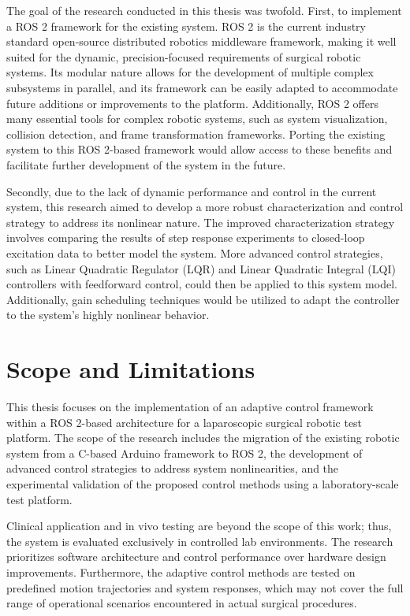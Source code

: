 The goal of the research conducted in this thesis was twofold. First, to implement a ROS 2 framework for the existing system. ROS 2 is the current industry standard open-source distributed robotics middleware framework, making it well suited for the dynamic, precision-focused requirements of surgical robotic systems. Its modular nature allows for the development of multiple complex subsystems in parallel, and its framework can be easily adapted to accommodate future additions or improvements to the platform. Additionally, ROS 2 offers many essential tools for complex robotic systems, such as system visualization, collision detection, and frame transformation frameworks. Porting the existing system to this ROS 2-based framework would allow access to these benefits and facilitate further development of the system in the future.

Secondly, due to the lack of dynamic performance and control in the current system, this research aimed to develop a more robust characterization and control strategy to address its nonlinear nature. The improved characterization strategy involves comparing the results of step response experiments to closed-loop excitation data to better model the system. More advanced control strategies, such as Linear Quadratic Regulator (LQR) and Linear Quadratic Integral (LQI) controllers with feedforward control, could then be applied to this system model. Additionally, gain scheduling techniques would be utilized to adapt the controller to the system’s highly nonlinear behavior.


\section{Scope and Limitations}
\label{section:scope_limitations}

This thesis focuses on the implementation of an adaptive control framework within a ROS 2-based architecture for a laparoscopic surgical robotic test platform. The scope of the research includes the migration of the existing robotic system from a C-based Arduino framework to ROS 2, the development of advanced control strategies to address system nonlinearities, and the experimental validation of the proposed control methods using a laboratory-scale test platform.

Clinical application and in vivo testing are beyond the scope of this work; thus, the system is evaluated exclusively in controlled lab environments. The research prioritizes software architecture and control performance over hardware design improvements. Furthermore, the adaptive control methods are tested on predefined motion trajectories and system responses, which may not cover the full range of operational scenarios encountered in actual surgical procedures.

